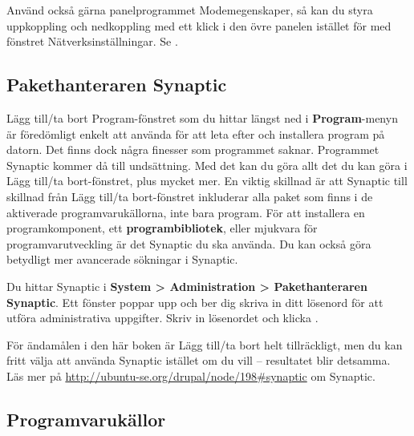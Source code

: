 \documentclass[a4paper,final]{memoir} %
\begin{document}
Använd också gärna panelprogrammet Modemegenskaper, så kan du styra uppkoppling och nedkoppling med ett klick i den övre panelen istället för med fönstret Nätverksinställningar. Se .


\subsection{Pakethanteraren Synaptic}



Lägg till/ta bort Program-fönstret som du hittar längst ned i \textbf{Program}-menyn är föredömligt enkelt att använda för att leta efter och installera program på datorn. Det finns dock några finesser som programmet saknar. Programmet Synaptic kommer då till undsättning. Med det kan du göra allt det du kan göra i Lägg till/ta bort-fönstret, plus mycket mer. En viktig skillnad är att Synaptic till skillnad från Lägg till/ta bort-fönstret inkluderar alla paket som finns i de aktiverade programvarukällorna, inte bara program. För att installera en programkomponent, ett \textbf{programbibliotek}, eller mjukvara för programvarutveckling är det Synaptic du ska använda. Du kan också göra betydligt mer avancerade sökningar i Synaptic. 

Du hittar Synaptic i \textbf{System \textgreater{} Administration \textgreater{} Pakethanteraren Synaptic}. Ett fönster poppar upp och ber dig skriva in ditt lösenord för att utföra administrativa uppgifter. Skriv in lösenordet och klicka \xok{}.

För ändamålen i den här boken är Lägg till/ta bort helt tillräckligt, men du kan fritt välja att använda Synaptic istället om du vill -- resultatet blir detsamma. Läs mer på \url{http://ubuntu-se.org/drupal/node/198#synaptic} om Synaptic.



\subsection{Programvarukällor}\label{sec:kallor}
\end{document}
